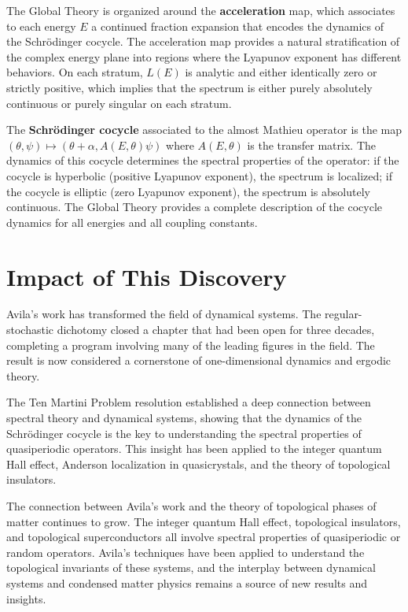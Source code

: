 The Global Theory is organized around the \textbf{acceleration} map, which associates to each energy $E$ a continued fraction expansion that encodes the dynamics of the Schr\"{o}dinger cocycle. The acceleration map provides a natural stratification of the complex energy plane into regions where the Lyapunov exponent has different behaviors. On each stratum, $L(E)$ is analytic and either identically zero or strictly positive, which implies that the spectrum is either purely absolutely continuous or purely singular on each stratum.

The \textbf{Schr\"{o}dinger cocycle} associated to the almost Mathieu operator is the map $(\theta, \psi) \mapsto (\theta + \alpha, A(E,\theta) \psi)$ where $A(E,\theta)$ is the transfer matrix. The dynamics of this cocycle determines the spectral properties of the operator: if the cocycle is hyperbolic (positive Lyapunov exponent), the spectrum is localized; if the cocycle is elliptic (zero Lyapunov exponent), the spectrum is absolutely continuous. The Global Theory provides a complete description of the cocycle dynamics for all energies and all coupling constants.

\section{Impact of This Discovery}

Avila's work has transformed the field of dynamical systems. The regular-stochastic dichotomy closed a chapter that had been open for three decades, completing a program involving many of the leading figures in the field. The result is now considered a cornerstone of one-dimensional dynamics and ergodic theory.

The Ten Martini Problem resolution established a deep connection between spectral theory and dynamical systems, showing that the dynamics of the Schr\"{o}dinger cocycle is the key to understanding the spectral properties of quasiperiodic operators. This insight has been applied to the integer quantum Hall effect, Anderson localization in quasicrystals, and the theory of topological insulators.

The connection between Avila's work and the theory of topological phases of matter continues to grow. The integer quantum Hall effect, topological insulators, and topological superconductors all involve spectral properties of quasiperiodic or random operators. Avila's techniques have been applied to understand the topological invariants of these systems, and the interplay between dynamical systems and condensed matter physics remains a source of new results and insights.

